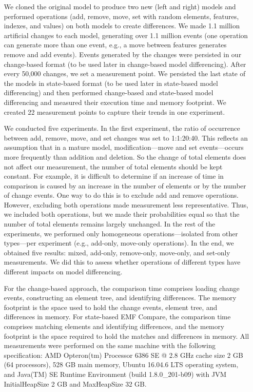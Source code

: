 We cloned the original model to produce two new (left and right) models and performed operations (\textsf{add}, \textsf{remove}, \textsf{move}, \textsf{set} with random elements, features, indexes, and values) on both models to create differences. We made 1.1 million artificial changes to each model, generating over 1.1 million events (one operation can generate more than one event, e.g., a \textsf{move} between features generates \textsf{remove} and \textsf{add} events). Events generated by the changes were persisted in our change-based format (to be used later in change-based model differencing). After every 50,000 changes, we set a measurement point. We persisted the last state of the models in state-based format (to be used later in state-based model differencing) and then performed change-based and state-based model differencing and measured their execution time and memory footprint. We created 22 measurement points to capture their trends in one experiment.

We conducted five experiments. In the first experiment, the ratio of occurrence between \textsf{add}, \textsf{remove}, \textsf{move}, and \textsf{set} changes was set to 1:1:20:40. This reflects an assumption that in a mature model, modification—\textsf{move} and \textsf{set} events—occurs more frequently than addition and deletion. So the change of total elements does not affect our measurement, the number of total elements should be kept constant. For example, it is difficult to determine if an increase of time in comparison is caused by an increase in the number of elements or by the number of change events. One way to do this is to exclude \textsf{add} and \textsf{remove} operations. However, excluding both operations made measurement less representative. Thus, we included both operations, but we made their probabilities equal so that the number of total elements remains largely unchanged. 
In the rest of the experiments, we performed only homogeneous operations—isolated from other types—per experiment (e.g., add-only, move-only operations). In the end, we obtained five results: mixed, add-only, remove-only, move-only, and set-only measurements. We did this to assess whether operations of different types have different impacts on model differencing.

For the change-based approach, the comparison time comprises loading change events, constructing an element tree, and identifying differences. The memory footprint is the space used to hold the change events, element tree, and differences in memory. For state-based EMF Compare, the comparison time comprises matching elements and identifying differences, and the memory footprint is the space required to hold the matches and differences in memory. All measurements were performed on the same machine with the following specification: AMD Opteron(tm) Processor 6386 SE @ 2.8 GHz cache size 2 GB (64 processors), 528 GB main memory, Ubuntu 16.04.6 LTS operating system, and Java(TM) SE Runtime Environment (build 1.8.0\_201-b09) with JVM \textsf{InitialHeapSize} 2 GB and \textsf{MaxHeapSize} 32 GB.


